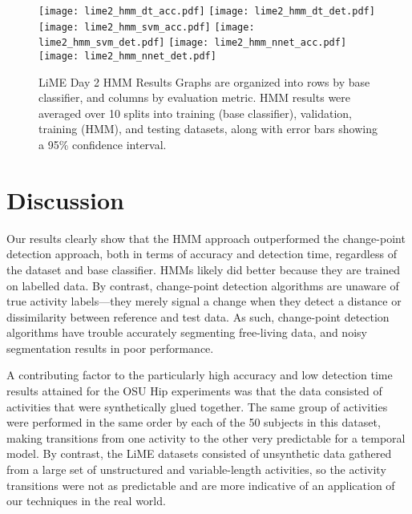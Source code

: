 \begin{figure}[H]
 \centering
 \texttt{[image: lime2\_hmm\_dt\_acc.pdf]} \hspace{1em}\vspace{1em}
 \texttt{[image: lime2\_hmm\_dt\_det.pdf]}
 \texttt{[image: lime2\_hmm\_svm\_acc.pdf]} \hspace{1em}\vspace{1em}
 \texttt{[image: lime2\_hmm\_svm\_det.pdf]}
 \texttt{[image: lime2\_hmm\_nnet\_acc.pdf]} \hspace{1em}
 \texttt{[image: lime2\_hmm\_nnet\_det.pdf]}
 \caption{LiME Day 2 HMM Results
  Graphs are organized into rows by base classifier, and columns by evaluation
  metric. HMM results were averaged over 10 splits into training
  (base classifier), validation, training (HMM), and testing datasets, along with 
  error bars showing a 95\% confidence interval.}
 \label{fig:lime2_hmm}
\end{figure}

\newpage

\section{Discussion}

Our results clearly show that the HMM approach outperformed the change-point
detection approach, both in terms of accuracy and detection time, regardless of
the dataset and base classifier. HMMs likely did better because they are trained
on labelled data. By contrast, change-point detection algorithms are unaware of
true activity labels---they merely signal a change when they detect a distance or
dissimilarity between reference and test data. As such, change-point detection
algorithms have trouble accurately segmenting free-living data, and noisy
segmentation results in poor performance.

A contributing factor to the particularly high accuracy and low detection time
results attained for the OSU Hip experiments was that the data consisted of
activities that were synthetically glued together. The same group of activities
were performed in the same order by each of the 50 subjects in this dataset,
making transitions from one activity to the other very predictable for a
temporal model. By contrast, the LiME datasets consisted of unsynthetic data
gathered from a large set of unstructured and variable-length activities,
so the activity transitions were not as predictable and are more indicative of
an application of our techniques in the real world.

